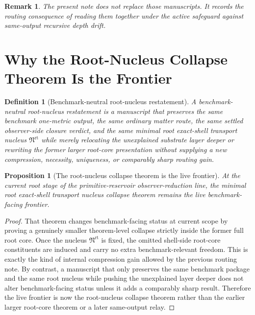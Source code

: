 \documentclass[11pt]{article}
\newcommand{\RootNucleus}{\mathfrak N^{\mathrm{rt}}}
\newtheorem{definition}{Definition}
\newtheorem{proposition}{Proposition}
\newtheorem{remark}{Remark}
\begin{document}
\begin{remark}
The present note does not replace those manuscripts. It records the routing consequence of reading them together under the active safeguard against same-output recursive depth drift.
\end{remark}

\section{Why the Root-Nucleus Collapse Theorem Is the Frontier}

\begin{definition}[Benchmark-neutral root-nucleus restatement]
A \emph{benchmark-neutral root-nucleus restatement} is a manuscript that preserves the same benchmark one-metric output, the same ordinary matter route, the same settled observer-side closure verdict, and the same minimal root exact-shell transport nucleus \(\RootNucleus\) while merely relocating the unexplained substrate layer deeper or rewriting the former larger root-core presentation without supplying a new compression, necessity, uniqueness, or comparably sharp routing gain.
\end{definition}

\begin{proposition}[The root-nucleus collapse theorem is the live frontier]
At the current root stage of the primitive-reservoir observer-reduction line, the minimal root exact-shell transport nucleus collapse theorem remains the live benchmark-facing frontier.
\end{proposition}

\begin{proof}
That theorem changes benchmark-facing status at current scope by proving a genuinely smaller theorem-level collapse strictly inside the former full root core. Once the nucleus \(\RootNucleus\) is fixed, the omitted shell-side root-core constituents are induced and carry no extra benchmark-relevant freedom. This is exactly the kind of internal compression gain allowed by the previous routing note. By contrast, a manuscript that only preserves the same benchmark package and the same root nucleus while pushing the unexplained layer deeper does not alter benchmark-facing status unless it adds a comparably sharp result. Therefore the live frontier is now the root-nucleus collapse theorem rather than the earlier larger root-core theorem or a later same-output relay.
\end{proof}
\end{document}

